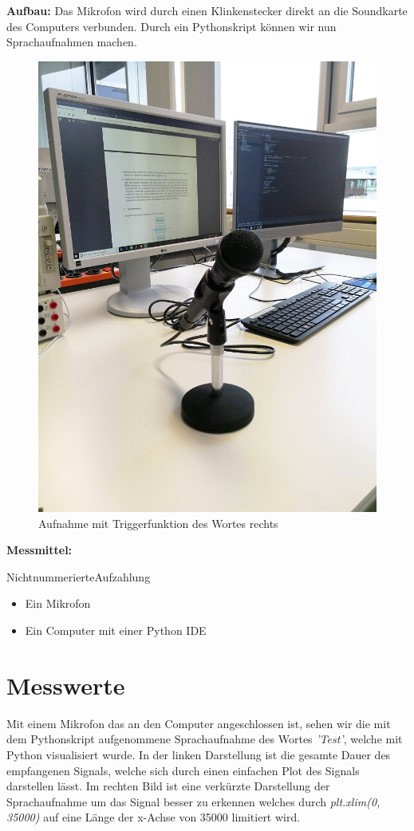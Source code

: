 \documentclass[12pt, oneside, a4paper, \docLanguage]{report}
\begin{document}
\newline
\textbf{Aufbau:}
\newline
Das Mikrofon wird durch einen Klinkenstecker direkt an die Soundkarte des Computers verbunden.
Durch ein Pythonskript können wir nun Sprachaufnahmen machen.
\begin{figure}[H]
	\centering
	\includegraphics[width=.5\linewidth]{media/aufbau.jpg}
	\caption{Aufnahme mit Triggerfunktion des Wortes rechts}
	\label{img:Aufnahme mit Triggerfunktion des Wortes rechts}
\end{figure}
\newpage
\textbf{Messmittel:}
\item[NichtnummerierteAufzahlung]~\par
   \begin{itemize}
      \item Ein Mikrofon
      \item Ein Computer mit einer Python IDE
   \end{itemize}
\newpage
\section{Messwerte}
\label{chap:VERSUCH_1_MESSWERTE}
Mit einem Mikrofon das an den Computer angeschlossen ist, sehen wir die mit dem Pythonskript aufgenommene Sprachaufnahme des Wortes \textit{'Test'}, welche mit Python visualisiert wurde.
\newline
In der linken Darstellung ist die gesamte Dauer des empfangenen Signals, welche sich durch einen einfachen Plot des Signals darstellen lässt.
\newline
Im rechten Bild ist eine verkürzte Darstellung der Sprachaufnahme um das Signal besser zu erkennen welches durch \textit{plt.xlim(0, 35000)} auf eine Länge der x-Achse von 35000 limitiert wird.
\end{document}
